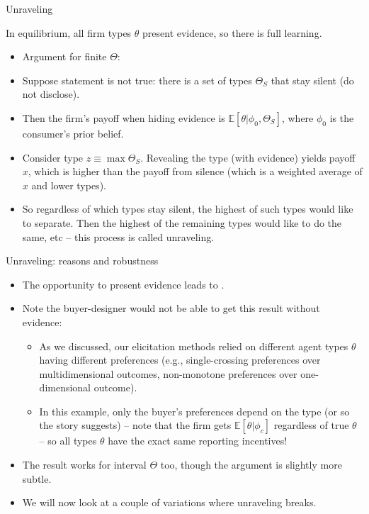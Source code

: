 \documentclass[english,10pt
,aspectratio=169
]{beamer}
\begin{document}
\begin{frame}{Unraveling}
	\begin{theorem}[Unraveling]
		In equilibrium, all firm types $\theta$ present evidence, so there is full learning.
	\end{theorem}
	\begin{itemize}[<+->]
		\item Argument for finite $\Theta$:
		\item Suppose statement is not true: there is a set of types $\Theta_S$ that stay silent (do not disclose).
		\item Then the firm's payoff when hiding evidence is $\mathbb{E}[\theta | \phi_0, \Theta_S]$, where $\phi_0$ is the consumer's prior belief.
		\item Consider type $z \equiv \max \Theta_S$. Revealing the type (with evidence) yields payoff $x$, which is higher than the payoff from silence (which is a weighted average of $x$ and lower types).
		\item So regardless of which types stay silent, the highest of such types would like to separate. Then the highest of the remaining types would like to do the same, etc -- this process is called \alert{unraveling}.
	\end{itemize}
\end{frame}


\begin{frame}{Unraveling: reasons and robustness}
	\begin{itemize}
		\item The opportunity to present evidence leads to .
		\item Note the buyer-designer would \alert{not be able} to get this result \alert{without evidence}:
		\begin{itemize}
			\item As we discussed, our elicitation methods relied on different agent types $\theta$ having different preferences (e.g., single-crossing preferences over multidimensional outcomes, non-monotone preferences over one-dimensional outcome).
			
			\item In this example, only the buyer's preferences depend on the type (or so the story suggests) -- note that the firm gets $\mathbb{E}[\theta | \phi_c]$ regardless of true $\theta$ -- so all types $\theta$ have the exact same reporting incentives! 
		\end{itemize}
		\pause
		\item The result works for interval $\Theta$ too, though the argument is slightly more subtle. 
		\item We will now look at a couple of variations where unraveling \alert{breaks}.
	\end{itemize}
\end{frame}
\end{document}
